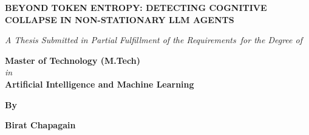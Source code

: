 \documentclass[12pt,a4paper]{report}
\begin{document}

\begin{titlepage}

    \begin{center}

        \vspace*{1cm}

        

        \Huge

        \textbf{BEYOND TOKEN ENTROPY: DETECTING COGNITIVE COLLAPSE IN NON-STATIONARY LLM AGENTS}

        

        \vspace{1.5cm}

        

        \Large

        \textit{A Thesis Submitted in Partial Fulfillment of the Requirements\ for the Degree of}

        

                \vspace{0.5cm}

        

                \textbf{Master of Technology (M.Tech)}\\

        

                \textit{in}\\

        

                \textbf{Artificial Intelligence and Machine Learning}

        

                

        

                \vspace{1.5cm}

        

                

        

                \textbf{By}

        

                

        

                \vspace{0.5cm}

        

                \textbf{Birat Chapagain}

        


\end{center}
\end{titlepage}
\end{document}
